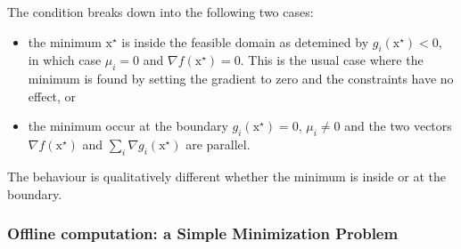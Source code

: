 \documentclass[11pt]{report}
\newcommand{\bs}[1]{\boldsymbol{#1}}
\newcommand{\bsx}{\bs{\mathrm{x}}}
\begin{document}
The condition breaks down into the following two cases:
\begin{itemize}
\item the minimum $\bsx^\star$ is inside the feasible domain as   detemined by $g_i(\bsx^\star) < 0$, in which case $\mu_i=0$ and   $\nabla f(\bsx^\star) = 0$. This is the usual case where the minimum   is found by setting the gradient to zero and the constraints have no   effect, or
\item the minimum occur at the boundary $g_i(\bsx^\star) = 0$,   $\mu_i\neq 0$ and the two vectors $\nabla f(\bsx^\star)$ and   $\sum_i \nabla g_i(\bsx^\star)$ are parallel.
\end{itemize}
The behaviour is qualitatively different whether the minimum is inside or at the boundary.


\subsubsection{Offline computation: a Simple Minimization Problem}
\end{document}
